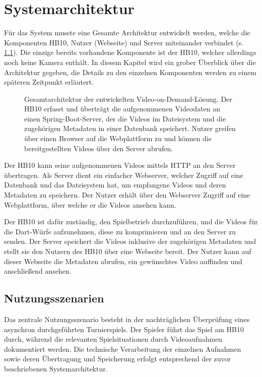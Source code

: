 \chapter{Systemarchitektur} \label{sec:system}

Für das System musste eine Gesamte Architektur entwickelt werden, welche die Komponenten HB10, Nutzer (Webseite) und Server miteinander verbindet (s. \ref{fig:architektur}). Die einzige bereits vorhandene Komponente ist der HB10, welcher allerdings noch keine Kamera enthält. 
In diesem Kapitel wird ein grober Überblick über die Architektur gegeben, die Details zu den einzelnen Komponenten werden zu einem späteren Zeitpunkt erläutert. 

\begin{figure}[H]
    \centering
    
    \caption[Gesamtarchitektur der Video-on-Demand-Lösung]{Gesamtarchitektur der entwickelten Video-on-Demand-Lösung. Der HB10 erfasst und überträgt die aufgenommenen Videodaten an einen Spring-Boot-Server, der die Videos im Dateisystem und die zugehörigen Metadaten in einer Datenbank speichert. 
    Nutzer greifen über einen Browser auf die Webplattform zu und können die bereitgestellten Videos über den Server abrufen.}
    \label{fig:architektur}
\end{figure}

Der HB10 kann seine aufgenommenen Videos mittels HTTP an den Server übertragen. Als Server dient ein einfacher Webserver, welcher Zugriff auf eine Datenbank und das Dateisystem hat, um empfangene Videos und deren Metadaten zu speichern. Der Nutzer erhält über den Webserver Zugriff auf eine Webplattform, 
über welche er die Videos ansehen kann.

Der HB10 ist dafür zuständig, den Spielbetrieb durchzuführen, und die Videos für die Dart-Würfe aufzunehmen, diese zu komprimieren und an den Server zu senden. Der Server speichert die Videos inklusive der zugehörigen Metadaten und stellt sie den Nutzern des HB10 über eine Webseite bereit. 
Der Nutzer kann auf dieser Webseite die Metadaten abrufen, ein gewünschtes Video auffinden und anschließend ansehen.

\section{Nutzungsszenarien}

Das zentrale Nutzungsszenario besteht in der nachträglichen Überprüfung eines asynchron durchgeführten Turnierspiels. Der Spieler führt das Spiel am HB10 durch, während die relevanten Spielsituationen durch Videoaufnahmen dokumentiert werden. 
Die technische Verarbeitung der einzelnen Aufnahmen sowie deren Übertragung und Speicherung erfolgt entsprechend der zuvor beschriebenen Systemarchitektur. 

